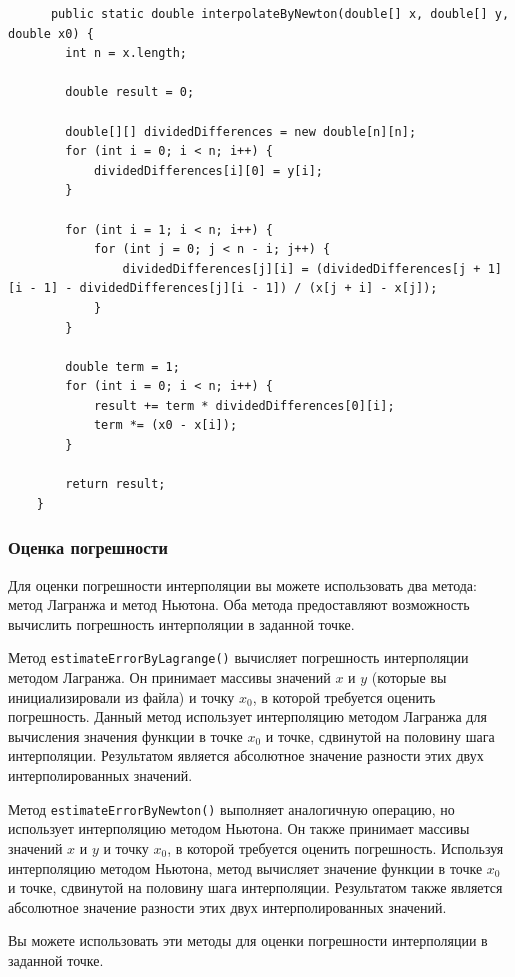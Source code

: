 \documentclass[12pt]{article}
\begin{document}
\begin{verbatim}
      public static double interpolateByNewton(double[] x, double[] y, double x0) {
        int n = x.length;

        double result = 0;

        double[][] dividedDifferences = new double[n][n];
        for (int i = 0; i < n; i++) {
            dividedDifferences[i][0] = y[i];
        }

        for (int i = 1; i < n; i++) {
            for (int j = 0; j < n - i; j++) {
                dividedDifferences[j][i] = (dividedDifferences[j + 1][i - 1] - dividedDifferences[j][i - 1]) / (x[j + i] - x[j]);
            }
        }

        double term = 1;
        for (int i = 0; i < n; i++) {
            result += term * dividedDifferences[0][i];
            term *= (x0 - x[i]);
        }

        return result;
    }
\end{verbatim}

\subsubsection{Оценка погрешности}

Для оценки погрешности интерполяции вы можете использовать два метода: метод Лагранжа и метод Ньютона. Оба метода предоставляют возможность вычислить погрешность интерполяции в заданной точке.

Метод \texttt{estimateErrorByLagrange()} вычисляет погрешность интерполяции методом Лагранжа. Он принимает массивы значений $x$ и $y$ (которые вы инициализировали из файла) и точку $x_0$, в которой требуется оценить погрешность. Данный метод использует интерполяцию методом Лагранжа для вычисления значения функции в точке $x_0$ и точке, сдвинутой на половину шага интерполяции. Результатом является абсолютное значение разности этих двух интерполированных значений.

Метод \texttt{estimateErrorByNewton()} выполняет аналогичную операцию, но использует интерполяцию методом Ньютона. Он также принимает массивы значений $x$ и $y$ и точку $x_0$, в которой требуется оценить погрешность. Используя интерполяцию методом Ньютона, метод вычисляет значение функции в точке $x_0$ и точке, сдвинутой на половину шага интерполяции. Результатом также является абсолютное значение разности этих двух интерполированных значений.

Вы можете использовать эти методы для оценки погрешности интерполяции в заданной точке.
\end{document}
